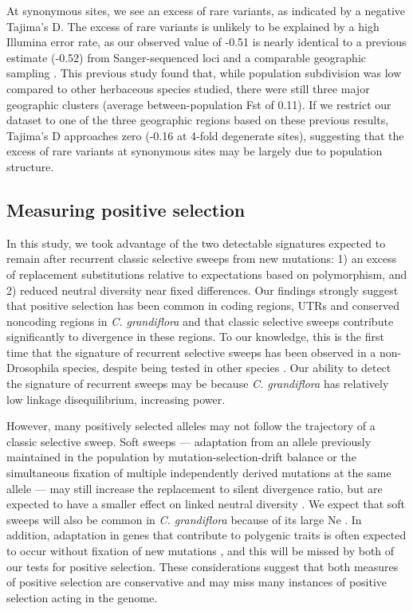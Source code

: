 At synonymous sites, we see an excess of rare variants, as indicated by a negative Tajima’s D. The excess of rare variants is unlikely to be explained by a high Illumina error rate, as our observed value of -0.51 is nearly identical to a previous estimate (-0.52) from Sanger-sequenced loci and a comparable geographic sampling \citep{St_onge2011-jz}. This previous study found that, while population subdivision was low compared to other herbaceous species studied, there were still three major geographic clusters (average between-population Fst of 0.11). If we restrict our dataset to one of the three geographic regions based on these previous results, Tajima’s D approaches zero (-0.16 at 4-fold degenerate sites), suggesting that the excess of rare variants at synonymous sites may be largely due to population structure. 

\subsection{Measuring positive selection}
	In this study, we took advantage of the two detectable signatures expected to remain after recurrent classic selective sweeps from new mutations: 1) an excess of replacement substitutions relative to expectations based on polymorphism, and 2) reduced neutral diversity near fixed differences. Our findings strongly suggest that positive selection has been common in coding regions, UTRs and conserved noncoding regions in \textit{C. grandiflora} and that classic selective sweeps contribute significantly to divergence in these regions. To our knowledge, this is the first time that the signature of recurrent selective sweeps has been observed in a non-Drosophila species, despite being tested in other species \citep{Halligan2013,hernandez2011}. Our ability to detect the signature of recurrent sweeps may be because \textit{C. grandiflora} has relatively low linkage disequilibrium, increasing power.

However, many positively selected alleles may not follow the trajectory of a classic selective sweep. Soft sweeps — adaptation from an allele previously maintained in the population by mutation-selection-drift balance or the simultaneous fixation of multiple independently derived mutations at the same allele — may still increase the replacement to silent divergence ratio, but are expected to have a smaller effect on linked neutral diversity \citep{hermisson2005,pennings2006_2,pennings2006_3}. We expect that soft sweeps will also be common in \textit{C. grandiflora} because of its large Ne \citep{hermisson2005,messer2013}. In addition, adaptation in genes that contribute to polygenic traits is often expected to occur without fixation of new mutations \citep{pavlidis2012}, and this will be missed by both of our tests for positive selection. These considerations suggest that both measures of positive selection are conservative and may miss many instances of positive selection acting in the genome.

